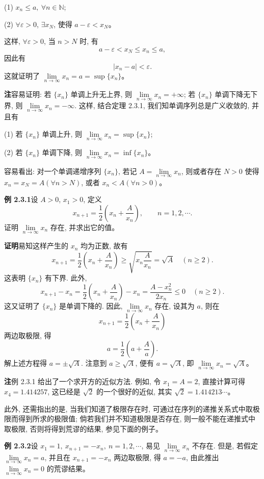 \documentclass[UTF8,12pt,a4paper,fontset=fandol]{ctexart}
\begin{document}
(1) $x_n\leqslant a,\ \forall n\in\mathbb{N}$;

(2) $\forall\varepsilon>0$, $\exists x_N$, 使得 $a-\varepsilon<x_N$。

这样, $\forall\varepsilon>0$, 当 $n>N$ 时, 有
\[
  a-\varepsilon<x_N\leqslant x_n\leqslant a,
\]
因此有
\[
  |x_n-a|<\varepsilon.
\]
这就证明了 $\lim\limits_{n\to\infty}x_n=a=\sup\{x_n\}$。

\noindent\textbf{注}\quad 容易证明: 若 $\{x_n\}$ 单调上升无上界, 则 $\lim\limits_{n\to\infty}x_n=+\infty$; 若 $\{x_n\}$ 单调下降无下界, 则 $\lim\limits_{n\to\infty}x_n=-\infty$. 这样, 结合定理 2.3.1, 我们知单调序列总是广义收敛的, 并且有

(1) 若 $\{x_n\}$ 单调上升, 则 $\lim\limits_{n\to\infty}x_n=\sup\{x_n\}$;

(2) 若 $\{x_n\}$ 单调下降, 则 $\lim\limits_{n\to\infty}x_n=\inf\{x_n\}$。

容易看出: 对一个单调递增序列 $\{x_n\}$, 若记 $A=\lim\limits_{n\to\infty}x_n$, 则或者存在 $N>0$ 使得 $x_n=x_N=A(\forall n>N)$, 或者 $x_n<A(\forall n>0)$。

\noindent\textbf{例 2.3.1}\quad 设 $A>0$, $x_1>0$, 定义
\[
  x_{n+1}=\frac12\left(x_n+\frac A{x_n}\right),\qquad n=1,2,\cdots.
\]
证明 $\lim\limits_{n\to\infty}x_n$ 存在, 并求出它的值。

\noindent\textbf{证明}\quad 易知这样产生的 $x_n$ 均为正数, 故有
\[
  x_{n+1}=\frac12\left(x_n+\frac A{x_n}\right)
  \geqslant \sqrt{x_n\frac A{x_n}}=\sqrt A
  \quad(n\geqslant2).
\]
这表明 $\{x_n\}$ 有下界. 此外,
\[
  x_{n+1}-x_n
  =
  \frac12\left(x_n+\frac A{x_n}\right)-x_n
  =
  \frac{A-x_n^2}{2x_n}\leqslant0
  \quad(n\geqslant2).
\]
这又证明了 $\{x_n\}$ 是单调下降的. 因此, $\lim\limits_{n\to\infty}x_n$ 存在, 设其为 $a$, 则在
\[
  x_{n+1}=\frac12\left(x_n+\frac A{x_n}\right)
\]
两边取极限, 得
\[
  a=\frac12\left(a+\frac Aa\right).
\]
解上述方程得 $a=\pm\sqrt A$. 注意到 $a\geqslant\sqrt A$, 便有 $a=\sqrt A$, 即 $\lim\limits_{n\to\infty}x_n=\sqrt A$。

\noindent\textbf{注}\quad 例 2.3.1 给出了一个求开方的近似方法. 例如, 令 $x_1=A=2$, 直接计算可得 $x_4=1.414257$, 这已经是 $\sqrt2$ 的一个很好的近似, 其实 $\sqrt2=1.414213\cdots$。

此外, 还需指出的是, 当我们知道了极限存在时, 可通过在序列的递推关系式中取极限而得到所求的极限值; 倘若我们并不知道极限是否存在, 则一般不能在递推式中取极限, 否则将得到荒谬的结果, 参见下面的例子。

\noindent\textbf{例 2.3.2}\quad 设 $x_1=1,\ x_{n+1}=-x_n,\ n=1,2,\cdots$, 易见 $\lim\limits_{n\to\infty}x_n$ 不存在. 但是, 若假定 $\lim\limits_{n\to\infty}x_n=a$, 并且在 $x_{n+1}=-x_n$ 两边取极限, 得 $a=-a$, 由此推出 $\lim\limits_{n\to\infty}x_n=0$ 的荒谬结果。
\end{document}
